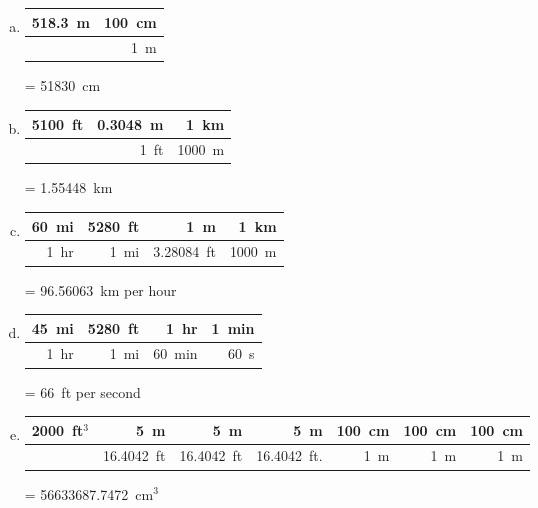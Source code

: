 \documentclass[11pt,letterpaper]{article}
\begin{document}
\sol
\begin{enumerate}[(a)]
\item \phantom{.}
	\begin{table}[!ht]
	\centering
	\begin{tabular}{r|r}
	518.3~m & 100~cm \\ \hline
		      & 1~m
	\end{tabular}
	= 51830~cm
	\end{table} \par

\item \phantom{.}
	\begin{table}[!ht]
	\centering
	\begin{tabular}{r|r|r}
	5100~ft & 0.3048~m & 1~km \\ \hline
		      & 1~ft		& 1000~m
	\end{tabular}
	= 1.55448~km
	\end{table} \par
 
\item \phantom{.}
	\begin{table}[!ht]
	\centering
	\begin{tabular}{r|r|r|r}
	60~mi  & 5280~ft  & 1~m		   & 1~km \\ \hline
	1~hr	    & 1~mi      & 3.28084~ft   & 1000~m
	\end{tabular}
	= 96.56063~km per hour
	\end{table} \par
 
\item \phantom{.}
	\begin{table}[!ht]
	\centering
	\begin{tabular}{r|r|r|r}
	45~mi  & 5280~ft  & 1~hr       & 1~min \\ \hline
	1~hr	    & 1~mi      & 60~min  & 60~s
	\end{tabular}
	= 66~ft per second
	\end{table} \par
 
\item \phantom{.}
	\begin{table}[!ht]
	\centering
	\begin{tabular}{r|r|r|r|r|r|r}
	2000~ft$^3$ & 5~m		& 5~m		& 5~m		& 100~cm & 100~cm & 100~cm \\ \hline
			    & 16.4042~ft & 16.4042~ft 	& 16.4042~ft.    & 1~m & 1~m & 1~m
	\end{tabular} \par\vspace{0.3cm}
	= 56633687.7472~cm$^3$
	\end{table} 
\end{enumerate}
\end{document}
